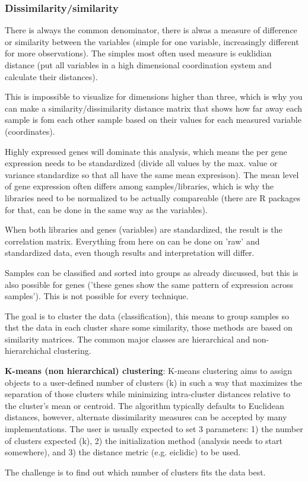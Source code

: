 \documentclass{article}
\begin{document}
\subsubsection{Dissimilarity/similarity}
There is always the common denominator, there is alwas a measure of difference or similarity between the variables (simple for one variable, increasingly different for more observations). The simples most often used measure is euklidian distance (put all variables in a high dimensional coordination system and calculate their distances). \par 
This is impossible to visualize for dimensions higher than three, which is why you can make a similarity/dissimilarity distance matrix that shows how far away each sample is fom each other sample based on their values for each measured variable (coordinates).\par 
Highly expressed genes will dominate this analysis, which means the per gene expression needs to be standardized (divide all values by the max. value or variance standardize so that all have the same mean expresison). The mean level of gene expression often differs among samples/libraries, which is why the libraries need to be normalized to be actually compareable (there are R packages for that, can be done in the same way as the variables).\par 
When both libraries and genes (variables) are standardized, the result is the correlation matrix. Everything from here on can be done on 'raw' and standardized data, even though results and interpretation will differ.\par 
Samples can be classified and sorted into groups as already discussed, but this is also possible for genes ('these genes show the same pattern of expression across samples'). This is not possible for every technique.\par 
The goal is to cluster the data (classification), this means to group samples so thst the data in each cluster share some similarity, those methods are based on similarity matrices. The common major classes are hierarchical and non-hierarchichal clustering.

\textbf{K-means (non hierarchical) clustering}: K-means clustering aims to assign objects to a user-defined number of clusters (k) in such a way that maximizes the separation of those clusters while minimizing intra-cluster distances relative to the cluster's mean or centroid. The algorithm typically defaults to Euclidean distances, however, alternate dissimilarity measures can be accepted by many implementations. The user is usually expected to set 3 parameters: 1) the number of clusters expected (k), 2) the initialization method (analysis needs to start somewhere), and 3) the distance metric (e.g. eiclidic) to be used.\par 
The challenge is to find out which number of clusters fits the data best.
\end{document}
